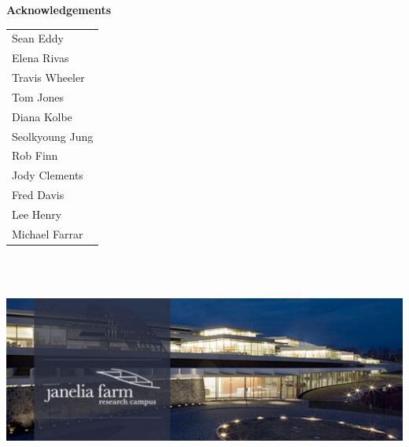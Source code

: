 \documentclass[landscape]{slides}
\begin{document}
\begin{slide}

\large
\begin{center}
\large{\textbf{Acknowledgements}} \\

\vspace{0.5in}

\normalsize
\begin{tabular}{l}
Sean Eddy           \\
Elena Rivas         \\
Travis Wheeler      \\
Tom Jones           \\
Diana Kolbe         \\
Seolkyoung Jung     \\
Rob Finn            \\
Jody Clements       \\
Fred Davis          \\
Lee Henry           \\
Michael Farrar      \\
\end{tabular}

\includegraphics[height=3in]{figs/jfrc-banner1}

\end{center}

\vfill
\end{slide}
\end{document}
